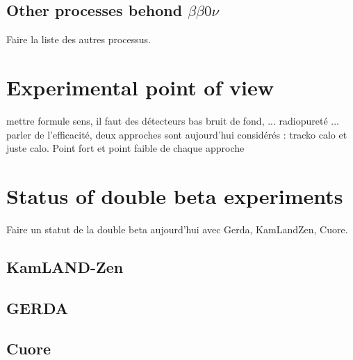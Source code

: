 \documentclass[main.tex]{subfiles}
\begin{document}
\subsection{Other processes behond $\beta\beta0\nu$}
\NI Faire la liste des autres processus.

\section{Experimental point of view}
\NI mettre formule sens, il faut des détecteurs bas bruit de fond, ... radiopureté ... parler de l'efficacité,
\NI deux approches sont aujourd'hui considérés : tracko calo et juste calo. Point fort et point faible de chaque approche


\section{Status of double beta experiments}
\NI Faire un statut de la double beta aujourd'hui avec 
\NI Gerda, KamLandZen, Cuore.
\subsection{KamLAND-Zen}
\subsection{GERDA}
\subsection{Cuore}
\end{document}

